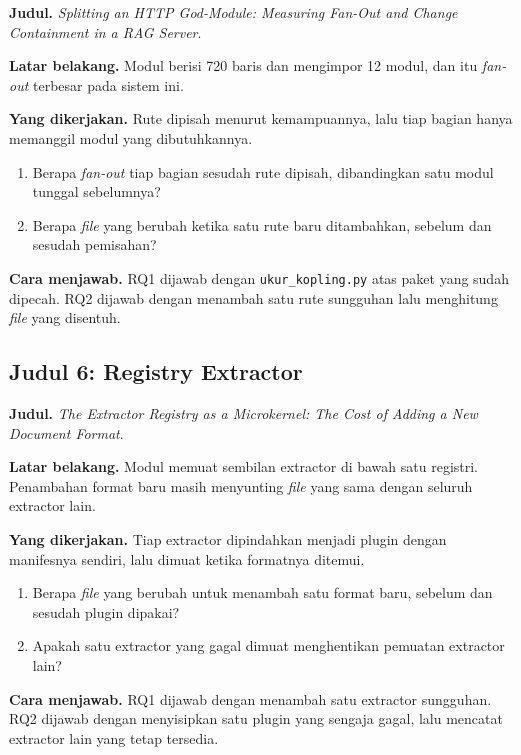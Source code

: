 \textbf{Judul.} \textit{Splitting an HTTP God-Module: Measuring Fan-Out and Change Containment in a RAG Server}.

\textbf{Latar belakang.} Modul  berisi 720 baris dan
mengimpor 12 modul, dan itu \textit{fan-out} terbesar pada sistem ini.

\textbf{Yang dikerjakan.} Rute dipisah menurut kemampuannya, lalu tiap bagian
hanya memanggil modul yang dibutuhkannya.

\begin{enumerate}
  \item Berapa \textit{fan-out} tiap bagian sesudah rute dipisah, dibandingkan
    satu modul tunggal sebelumnya?
  \item Berapa \textit{file} yang berubah ketika satu rute baru ditambahkan, sebelum
    dan sesudah pemisahan?
\end{enumerate}

\textbf{Cara menjawab.} RQ1 dijawab dengan \texttt{ukur\_kopling.py} atas
paket yang sudah dipecah. RQ2 dijawab dengan menambah satu rute sungguhan lalu
menghitung \textit{file} yang disentuh.

\subsection*{Judul 6: Registry Extractor}

\textbf{Judul.} \textit{The Extractor Registry as a Microkernel: The
Cost of Adding a New Document Format}.

\textbf{Latar belakang.} Modul  memuat sembilan
extractor di bawah satu registri. Penambahan format baru masih menyunting
\textit{file} yang sama dengan seluruh extractor lain.

\textbf{Yang dikerjakan.} Tiap extractor dipindahkan menjadi plugin dengan
manifesnya sendiri, lalu dimuat ketika formatnya ditemui.

\begin{enumerate}
  \item Berapa \textit{file} yang berubah untuk menambah satu format baru, sebelum
    dan sesudah plugin dipakai?
  \item Apakah satu extractor yang gagal dimuat menghentikan pemuatan extractor
    lain?
\end{enumerate}

\textbf{Cara menjawab.} RQ1 dijawab dengan menambah satu extractor sungguhan.
RQ2 dijawab dengan menyisipkan satu plugin yang sengaja gagal, lalu mencatat
extractor lain yang tetap tersedia.

